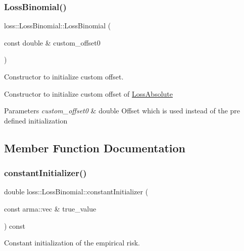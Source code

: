 \subsubsection{\texorpdfstring{Loss\+Binomial()}{LossBinomial()}\hspace{0.1cm}{\footnotesize\ttfamily [2/2]}}
{\footnotesize\ttfamily loss\+::\+Loss\+Binomial\+::\+Loss\+Binomial (\begin{DoxyParamCaption}\item[{const double \&}]{custom\+\_\+offset0 }\end{DoxyParamCaption})}



Constructor to initialize custom offset. 

Constructor to initialize custom offset of {\ttfamily \hyperlink{classloss_1_1_loss_absolute}{Loss\+Absolute}}


\begin{DoxyParams}{Parameters}
{\em custom\+\_\+offset0} & {\ttfamily double} Offset which is used instead of the pre defined initialization \\
\hline
\end{DoxyParams}


\subsection{Member Function Documentation}
\mbox{\label{classloss_1_1_loss_binomial_a21c384401aa0ef9b2db379e6822c3570}} 
\subsubsection{\texorpdfstring{constant\+Initializer()}{constantInitializer()}}
{\footnotesize\ttfamily double loss\+::\+Loss\+Binomial\+::constant\+Initializer (\begin{DoxyParamCaption}\item[{const arma\+::vec \&}]{true\+\_\+value }\end{DoxyParamCaption}) const\hspace{0.3cm}{\ttfamily [virtual]}}



Constant initialization of the empirical risk. 

